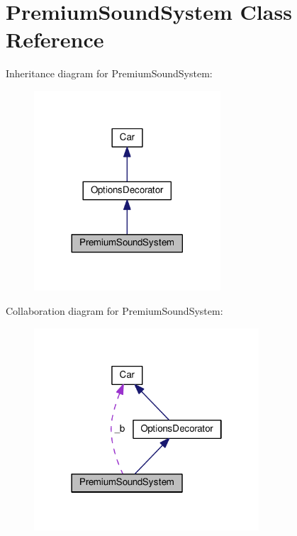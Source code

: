 \hypertarget{classPremiumSoundSystem}{}\section{Premium\+Sound\+System Class Reference}
\label{classPremiumSoundSystem}


Inheritance diagram for Premium\+Sound\+System\+:
\nopagebreak
\begin{figure}[H]
\begin{center}
\leavevmode
\includegraphics[width=197pt]{classPremiumSoundSystem__inherit__graph}
\end{center}
\end{figure}


Collaboration diagram for Premium\+Sound\+System\+:
\nopagebreak
\begin{figure}[H]
\begin{center}
\leavevmode
\includegraphics[width=238pt]{classPremiumSoundSystem__coll__graph}
\end{center}
\end{figure}
